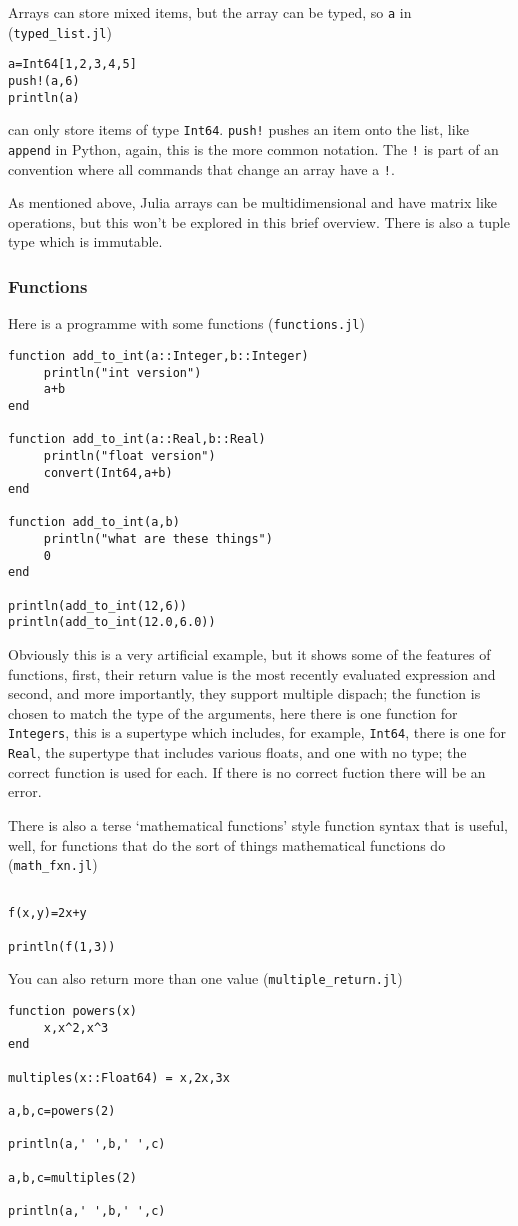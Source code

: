 \documentclass[12pt]{article}
\begin{document}
Arrays can store mixed items, but the array can be typed, so \texttt{a} in (\texttt{typed\_list.jl})
\begin{lstlisting}[numbers=right]
a=Int64[1,2,3,4,5]
push!(a,6)
println(a)
\end{lstlisting}
can only store items of type \texttt{Int64}. \texttt{push!} pushes an
item onto the list, like \texttt{append} in Python, again, this is the
more common notation. The \texttt{!} is part of an convention where
all commands that change an array have a \texttt{!}.

As mentioned above, Julia arrays can be multidimensional and have
matrix like operations, but this won't be explored in this brief
overview. There is also a tuple type which is immutable.

\subsubsection*{Functions}
Here is a programme with some functions (\texttt{functions.jl})
\begin{lstlisting}[numbers=right]
function add_to_int(a::Integer,b::Integer)
	 println("int version")
	 a+b
end

function add_to_int(a::Real,b::Real)
	 println("float version")
	 convert(Int64,a+b)
end

function add_to_int(a,b)
	 println("what are these things")
	 0
end

println(add_to_int(12,6))
println(add_to_int(12.0,6.0))
\end{lstlisting}
Obviously this is a very artificial example, but it shows some of the
features of functions, first, their return value is the most recently
evaluated expression and second, and more importantly, they support
multiple dispach; the function is chosen to match the type of the
arguments, here there is one function for \texttt{Integers}, this is a
supertype which includes, for example, \texttt{Int64}, there is one
for \texttt{Real}, the supertype that includes various floats, and one
with no type; the correct function is used for each. If there is no
correct fuction there will be an error.

There is also a terse \lq{}mathematical functions\rq{} style function
syntax that is useful, well, for functions that do the sort of things
mathematical functions do (\texttt{math\_fxn.jl})
\begin{lstlisting}[numbers=right]

f(x,y)=2x+y

println(f(1,3))

\end{lstlisting}
You can also return more than one value (\texttt{multiple\_return.jl})
\begin{lstlisting}[numbers=right]
function powers(x)
	 x,x^2,x^3
end

multiples(x::Float64) = x,2x,3x

a,b,c=powers(2)

println(a,' ',b,' ',c)

a,b,c=multiples(2)

println(a,' ',b,' ',c)

\end{lstlisting}
\end{document}
